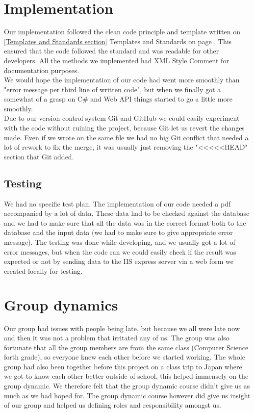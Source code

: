 \section{Implementation}
Our implementation followed the clean code principle and template written on \ref{Templates and Standards section} Templates and Standards on page \pageref{Templates and Standards section}. This ensured that the code followed the standard and was readable for other developers. All the methods we implemented had XML Style Comment for documentation purposes. \\
We would hope the implementation of our code had went more smoothly than "error message per third line of written code", but when we finally got a somewhat of a grasp on C\# and Web API things started to go a little more smoothly.\\
Due to our version control system Git and GitHub we could easily experiment with the code without ruining the project, because Git let us revert the changes made. Even if we wrote on the same file we had no big Git conflict that needed a lot of rework to fix the merge, it was usually just removing the "<<<<<HEAD" section that Git added.

\subsection{Testing}
We had no specific test plan. The implementation of our code needed a pdf accompanied by a lot of data. These data had to be checked against the database and we had to make sure that all the data was in the correct format both to the database and the input data (we had to make sure to give appropriate error message). The testing was done while developing, and we usually got a lot of error messages, but when the code ran we could easily check if the result was expected or not by sending data to the IIS express server via a web form we created locally for testing.

\section{Group dynamics}
Our group had issues with people being late, but because we all were late now and then it was not a problem that irritated any of us. The group was also fortunate that all the group members are from the same class (Computer Science forth grade), so everyone knew each other before we started working. The whole group had also been together before this project on a class trip to Japan where we got to know each other better outside of school, this helped immensely on the group dynamic. We therefore felt that the group dynamic course didn't give us as much as we had hoped for. The group dynamic course however did give us insight of our group and helped us defining roles and responsibility amongst us.



